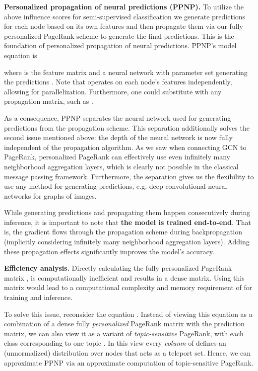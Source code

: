 \documentclass{article} \usepackage{iclr2019_conference,times}
\begin{document}
\textbf{Personalized propagation of neural predictions (PPNP).} To utilize the above influence scores for semi-supervised classification we generate predictions for each node based on its own features and then propagate them via our fully personalized PageRank scheme to generate the final predictions. This is the foundation of personalized propagation of neural predictions. PPNP's model equation is

where  is the feature matrix and  a neural network with parameter set  generating the predictions . Note that  operates on each node's features independently, allowing for parallelization. Furthermore, one could substitute  with any propagation matrix, such as .

As a consequence, PPNP separates the neural network used for generating predictions from the propagation scheme. This separation additionally solves the second issue mentioned above: the depth of the neural network is now fully independent of the propagation algorithm. As we saw when connecting GCN to PageRank, personalized PageRank can effectively use even infinitely many neighborhood aggregation layers, which is clearly not possible in the classical message passing framework. Furthermore, the separation gives us the flexibility to use any method for generating predictions, e.g. deep convolutional neural networks for graphs of images.

While generating predictions and propagating them happen consecutively during inference, it is important to note that \textbf{the model is trained end-to-end}. That is, the gradient flows through the propagation scheme during backpropagation (implicitly considering infinitely many neighborhood aggregation layers). Adding these propagation effects significantly improves the model's accuracy.

\textbf{Efficiency analysis.} Directly calculating the fully personalized PageRank matrix , is computationally inefficient and results in a dense  matrix. Using this matrix would lead to a computational complexity and memory requirement of  for training and inference.

To solve this issue, reconsider the equation . Instead of viewing this equation as a combination of a dense fully \textit{personalized} PageRank matrix with the prediction matrix, we can also view it as a variant of \textit{topic-sensitive} PageRank, with each class corresponding to one topic \citep{haveliwala_topic-sensitive_2002}. In this view every \textit{column} of  defines an (unnormalized) distribution over nodes that acts as a teleport set. Hence, we can approximate PPNP via an approximate computation of topic-sensitive PageRank.
\end{document}
